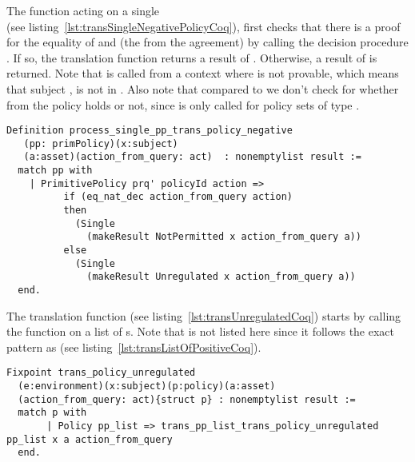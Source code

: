 The function  acting on a single \\  (see listing~\ref{lst:transSingleNegativePolicyCoq}), first checks that there is a proof for the equality of  and  (the  from the agreement) by calling the decision procedure . If so, the translation function returns a result of . Otherwise, a result of  is returned. Note that  is called from a context where  is not provable, which means that subject , is not in . Also note that compared to  we don't check for whether  from the policy holds or not, since  is only called for policy sets of type .


\begin{minipage}[c]{0.95\textwidth}
\begin{lstlisting}
Definition process_single_pp_trans_policy_negative
   (pp: primPolicy)(x:subject)
   (a:asset)(action_from_query: act)  : nonemptylist result :=
  match pp with
    | PrimitivePolicy prq' policyId action =>
          if (eq_nat_dec action_from_query action)
          then
            (Single 
              (makeResult NotPermitted x action_from_query a))
          else
            (Single 
              (makeResult Unregulated x action_from_query a))
  end.
\end{lstlisting}
\end{minipage}

The  translation function (see listing~\ref{lst:transUnregulatedCoq}) starts by calling the function  on a list of s. Note that  is not listed here since it follows the exact pattern as  (see listing~\ref{lst:transListOfPositiveCoq}).

\begin{lstlisting}   
Fixpoint trans_policy_unregulated
  (e:environment)(x:subject)(p:policy)(a:asset)
  (action_from_query: act){struct p} : nonemptylist result :=
  match p with
       | Policy pp_list => trans_pp_list_trans_policy_unregulated pp_list x a action_from_query
  end.
\end{lstlisting}


